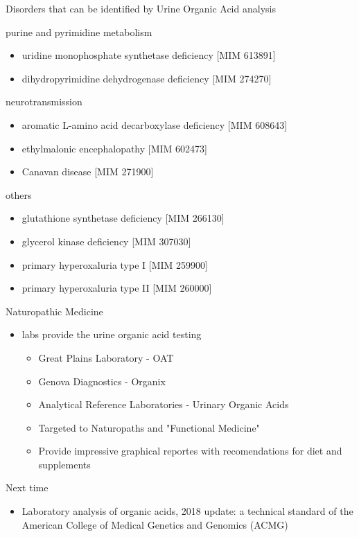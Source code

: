 \documentclass[presentation, smaller]{beamer}
\begin{document}
\begin{frame}[label={sec:orgheadline12}]{Disorders that can be identified by Urine Organic Acid analysis}
\begin{block}{purine and pyrimidine metabolism}
\begin{itemize}
\item uridine monophosphate synthetase deficiency [MIM 613891]
\item dihydropyrimidine dehydrogenase deficiency [MIM 274270]
\end{itemize}
\end{block}
\begin{block}{neurotransmission}
\begin{itemize}
\item aromatic L-amino acid decarboxylase deficiency [MIM 608643]
\item ethylmalonic encephalopathy [MIM 602473]
\item Canavan disease [MIM 271900]
\end{itemize}
\end{block}
\begin{block}{others}
\begin{itemize}
\item glutathione synthetase deficiency [MIM 266130]
\item glycerol kinase deficiency [MIM 307030]
\item primary hyperoxaluria type I [MIM 259900]
\item primary hyperoxaluria type II [MIM 260000]
\end{itemize}
\end{block}
\end{frame}


\begin{frame}[label={sec:orgheadline13}]{Naturopathic Medicine}
\begin{itemize}
\item labs provide the urine organic acid testing 
\begin{itemize}
\item Great Plains Laboratory - OAT
\item Genova Diagnostics - Organix
\item Analytical Reference Laboratories - Urinary Organic Acids

\item Targeted to Naturopaths and  "Functional Medicine"
\item Provide impressive graphical reportes with recomendations for diet and supplements
\end{itemize}
\end{itemize}
\end{frame}

\begin{frame}[label={sec:orgheadline14}]{Next time}
\begin{itemize}
\item Laboratory analysis of organic acids, 2018 update: a technical
standard of the American College of Medical Genetics and Genomics
(ACMG)
\end{itemize}
\end{frame}
\end{document}
